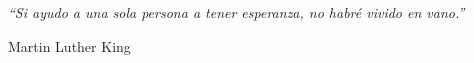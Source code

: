 \documentclass[letterpaper, 11pt, oneside]{Thesis}  %
\begin{document}
 
 
 
 
 
 
%
\pagestyle{empty}  %

\null\vfill
\textit{``Si ayudo a una sola persona a tener esperanza, no habré vivido en vano.''}

\begin{flushright}
Martin Luther King
\end{flushright}

\vfill\vfill\vfill\vfill\vfill\vfill\null
\clearpage  %
\end{document}
